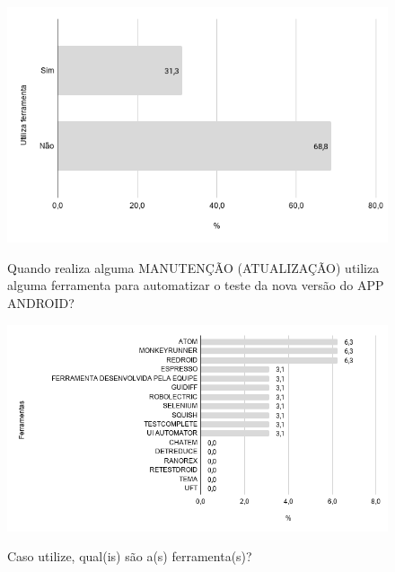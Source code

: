     
        \begin{figure}[!htb]
        \centering
        \includegraphics[width=.80\textwidth]{images/s_testenovo.png}
        \label{figure:s_testenovo}
        \caption{Quando realiza alguma MANUTENÇÃO (ATUALIZAÇÃO) utiliza alguma ferramenta para automatizar o teste da nova versão do APP ANDROID?}
        \end{figure}
    
    
        \begin{figure}[!htb]
        \centering
        \includegraphics[width=.80\textwidth]{images/s_ferramentastestenovo.png}
        \label{figure:s_ferramentastestenovo}
        \caption{Caso utilize, qual(is) são a(s) ferramenta(s)?}
        \end{figure}
    

